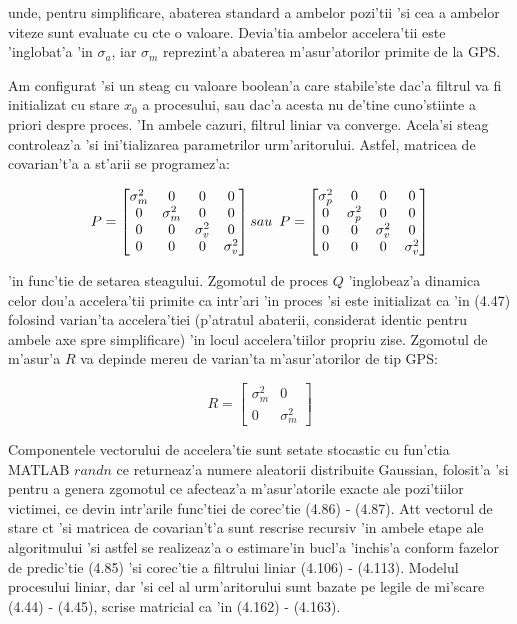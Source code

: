 \documentclass[12pt,a4paper,twoside]{report}
\begin{document}
unde, pentru simplificare, abaterea standard a ambelor pozi'tii 'si cea a ambelor viteze sunt evaluate cu c\ia te o valoare. Devia'tia ambelor accelera'tii este 'inglobat'a 'in $\sigma_{a}$, iar $\sigma_{m}$ reprezint'a abaterea m'asur'atorilor primite de la GPS. 

\vspace{5px}

Am configurat 'si un steag cu valoare boolean'a care stabile'ste dac'a filtrul va fi initializat cu stare $x_0$ a procesului, sau dac'a acesta nu de'tine cuno'stiinte a priori despre proces. 'In ambele cazuri, filtrul liniar va converge. Acela'si steag controleaz'a 'si ini'tializarea parametrilor urm'aritorului. Astfel, matricea de covarian't'a a st'arii se programez'a:

\begin{gather}
\centering
    P = \begin{bmatrix}
     \sigma^2_{m} & 0 & 0 & 0 \\ 0 & \sigma^2_{m} & 0 & 0 \\ 0 & 0 &  \sigma^2_{v} & 0 \\ 0 & 0 & 0 & \sigma^2_{v} 
    \end{bmatrix} sau \hspace{5px}
     P = \begin{bmatrix}
     \sigma^2_{p} & 0 & 0 & 0 \\ 0 &  \sigma^2_{p} & 0 & 0 \\ 0 & 0 &  \sigma^2_{v} & 0 \\ 0 & 0 & 0 & \sigma^2_{v} 
    \end{bmatrix}
\end{gather}

'in func'tie de setarea steagului. Zgomotul de proces $Q$ 'inglobeaz'a dinamica celor dou'a accelera'tii primite ca intr'ari 'in proces 'si este initializat ca 'in (4.47) folosind varian'ta accelera'tiei (p'atratul abaterii, considerat identic pentru ambele axe spre simplificare) 'in locul accelera'tiilor propriu zise. Zgomotul de m'asur'a $R$ va depinde mereu de varian'ta m'asur'atorilor de tip GPS:


\begin{equation}
    R = \begin{bmatrix}
     \sigma^2_{m} & 0 \\ 0 & \sigma^2_{m}
    \end{bmatrix}
\end{equation}

Componentele vectorului de accelera'tie sunt setate stocastic cu fun'ctia MATLAB $randn$ \cite{randn} ce returneaz'a numere aleatorii distribuite Gaussian, folosit'a 'si pentru a genera zgomotul ce afecteaz'a m'asur'atorile exacte ale pozi'tiilor victimei, ce devin intr'arile func'tiei de corec'tie (4.86) - (4.87). At\ia t vectorul de stare c\ia t 'si matricea de covarian't'a sunt rescrise recursiv 'in ambele etape ale algoritmului 'si astfel se realizeaz'a o estimare'in bucl'a 'inchis'a conform fazelor de predic'tie  (4.85) 'si corec'tie a filtrului liniar (4.106) - (4.113). Modelul procesului liniar, dar 'si cel al urm'aritorului sunt bazate pe legile de mi'scare (4.44) - (4.45), scrise matricial ca 'in (4.162) - (4.163).  
\end{document}
